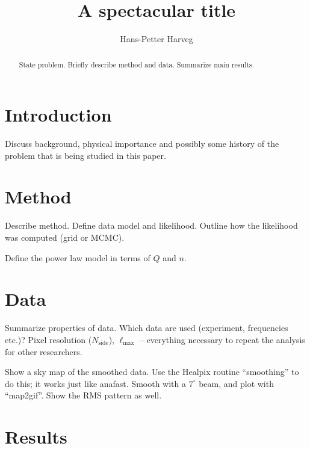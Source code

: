 \documentclass{emulateapj}
\begin{document}
\title{A spectacular title}

\author{Hans-Petter Harveg}





\begin{abstract}
  State problem. Briefly describe method and data. Summarize main results.
\end{abstract}

\section{Introduction}
\label{sec:introduction}

Discuss background, physical importance and possibly some history of
the problem that is being studied in this paper.


\section{Method}
\label{sec:method}


Describe method. Define data model and likelihood. Outline how the
likelihood was computed (grid or MCMC).

Define the power law model in terms of $Q$ and $n$. 

\section{Data}
\label{sec:data}

Summarize properties of data. Which data are used (experiment,
frequencies etc.)? Pixel resolution ($N_{\textrm{side}}$),
$\ell_{\textrm{max}}$ -- everything necessary to repeat the analysis
for other researchers.

Show a sky map of the smoothed data. Use the Healpix routine
``smoothing'' to do this; it works just like anafast. Smooth with a
$7^{\circ}$ beam, and plot with ``map2gif''. Show the RMS pattern as
well. 

\section{Results}
\label{sec:results}
\end{document}
